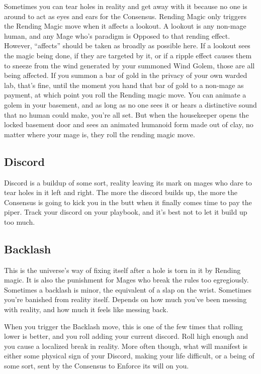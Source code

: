 \documentclass[
]{article}
\begin{document}
Sometimes you can tear holes in reality and get away with it because no
one is around to act as eyes and ears for the Consensus. Rending Magic
only triggers the Rending Magic move when it affects a lookout. A
lookout is any non-mage human, and any Mage who's paradigm is Opposed to
that rending effect. However, ``affects'' should be taken as broadly as
possible here. If a lookout sees the magic being done, if they are
targeted by it, or if a ripple effect causes them to sneeze from the
wind generated by your summoned Wind Golem, those are all being
affected. If you summon a bar of gold in the privacy of your own warded
lab, that's fine, until the moment you hand that bar of gold to a
non-mage as payment, at which point you roll the Rending magic move. You
can animate a golem in your basement, and as long as no one sees it or
hears a distinctive sound that no human could make, you're all set. But
when the housekeeper opens the locked basement door and sees an animated
humanoid form made out of clay, no matter where your mage is, they roll
the rending magic move.

\hypertarget{discord}{%
\subsection{Discord}\label{discord}}

Discord is a buildup of some sort, reality leaving its mark on mages who
dare to tear holes in it left and right. The more the discord builds up,
the more the Consensus is going to kick you in the butt when it finally
comes time to pay the piper. Track your discord on your playbook, and
it's best not to let it build up too much.

\label{Backlash chapter}

\hypertarget{backlash}{%
\subsection{Backlash}\label{backlash}}

This is the universe's way of fixing itself after a hole is torn in it
by Rending magic. It is also the punishment for Mages who break the
rules too egregiously. Sometimes a backlash is minor, the equivalent of
a slap on the wrist. Sometimes you're banished from reality itself.
Depends on how much you've been messing with reality, and how much it
feels like messing back.

When you trigger the Backlash move, this is one of the few times that
rolling lower is better, and you roll adding your current discord. Roll
high enough and you cause a localized break in reality. More often
though, what will manifest is either some physical sign of your Discord,
making your life difficult, or a being of some sort, sent by the
Consensus to Enforce its will on you.
\end{document}
